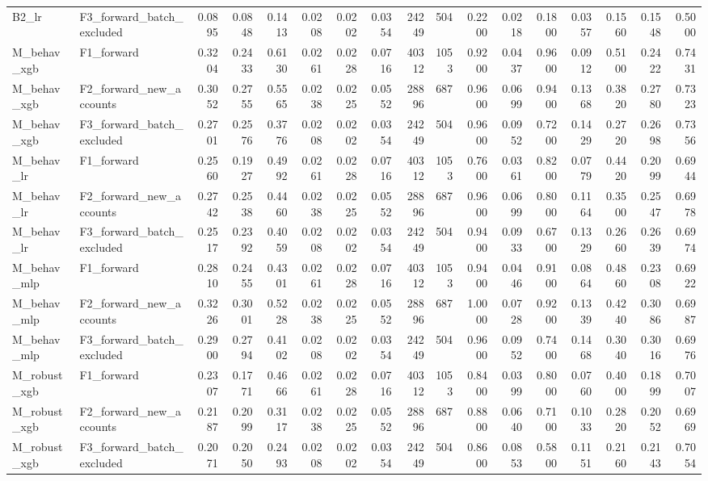 \begin{table}
\begin{tabular}{llrrrrrrrrrrrrrrr}
B2\_lr & F3\_forward\_batch\_excluded & 0.0895 & 0.0848 & 0.1413 & 0.0208 & 0.0202 & 0.0354 & 24249 & 504 & 0.2200 & 0.0218 & 0.1800 & 0.0357 & 0.1560 & 0.1548 & 0.5000 \\
M\_behav\_xgb & F1\_forward & 0.3204 & 0.2433 & 0.6130 & 0.0261 & 0.0228 & 0.0716 & 40312 & 1053 & 0.9200 & 0.0437 & 0.9600 & 0.0912 & 0.5100 & 0.2422 & 0.7431 \\
M\_behav\_xgb & F2\_forward\_new\_accounts & 0.3052 & 0.2755 & 0.5565 & 0.0238 & 0.0225 & 0.0552 & 28896 & 687 & 0.9600 & 0.0699 & 0.9400 & 0.1368 & 0.3820 & 0.2780 & 0.7323 \\
M\_behav\_xgb & F3\_forward\_batch\_excluded & 0.2701 & 0.2576 & 0.3776 & 0.0208 & 0.0202 & 0.0354 & 24249 & 504 & 0.9600 & 0.0952 & 0.7200 & 0.1429 & 0.2720 & 0.2698 & 0.7356 \\
M\_behav\_lr & F1\_forward & 0.2560 & 0.1927 & 0.4992 & 0.0261 & 0.0228 & 0.0716 & 40312 & 1053 & 0.7600 & 0.0361 & 0.8200 & 0.0779 & 0.4420 & 0.2099 & 0.6944 \\
M\_behav\_lr & F2\_forward\_new\_accounts & 0.2742 & 0.2538 & 0.4460 & 0.0238 & 0.0225 & 0.0552 & 28896 & 687 & 0.9600 & 0.0699 & 0.8000 & 0.1164 & 0.3500 & 0.2547 & 0.6978 \\
M\_behav\_lr & F3\_forward\_batch\_excluded & 0.2517 & 0.2392 & 0.4059 & 0.0208 & 0.0202 & 0.0354 & 24249 & 504 & 0.9400 & 0.0933 & 0.6700 & 0.1329 & 0.2660 & 0.2639 & 0.6974 \\
M\_behav\_mlp & F1\_forward & 0.2810 & 0.2455 & 0.4301 & 0.0261 & 0.0228 & 0.0716 & 40312 & 1053 & 0.9400 & 0.0446 & 0.9100 & 0.0864 & 0.4860 & 0.2308 & 0.6922 \\
M\_behav\_mlp & F2\_forward\_new\_accounts & 0.3226 & 0.3001 & 0.5228 & 0.0238 & 0.0225 & 0.0552 & 28896 & 687 & 1.0000 & 0.0728 & 0.9200 & 0.1339 & 0.4240 & 0.3086 & 0.6987 \\
M\_behav\_mlp & F3\_forward\_batch\_excluded & 0.2900 & 0.2794 & 0.4102 & 0.0208 & 0.0202 & 0.0354 & 24249 & 504 & 0.9600 & 0.0952 & 0.7400 & 0.1468 & 0.3040 & 0.3016 & 0.6976 \\
M\_robust\_xgb & F1\_forward & 0.2307 & 0.1771 & 0.4666 & 0.0261 & 0.0228 & 0.0716 & 40312 & 1053 & 0.8400 & 0.0399 & 0.8000 & 0.0760 & 0.4000 & 0.1899 & 0.7007 \\
M\_robust\_xgb & F2\_forward\_new\_accounts & 0.2187 & 0.2099 & 0.3117 & 0.0238 & 0.0225 & 0.0552 & 28896 & 687 & 0.8800 & 0.0640 & 0.7100 & 0.1033 & 0.2820 & 0.2052 & 0.6969 \\
M\_robust\_xgb & F3\_forward\_batch\_excluded & 0.2071 & 0.2050 & 0.2493 & 0.0208 & 0.0202 & 0.0354 & 24249 & 504 & 0.8600 & 0.0853 & 0.5800 & 0.1151 & 0.2160 & 0.2143 & 0.7054 \\

\end{tabular}
\end{table}
